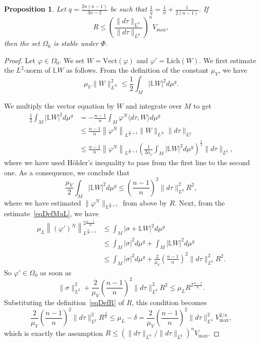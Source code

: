 \documentclass[a4paper, 10pt, reqno]{amsart}
\theoremstyle{plain}
\newtheorem{proposition}[thm]{Proposition}
\theoremstyle{remark}
\theoremstyle{definition}
\renewcommand{\phi}{\varphi}
\newcommand{\bL}{\mathbb{L}}
\let\<\langle
\let\>\rangle
\begin{document}
\begin{proposition}\label{propStability}
	Let $q = \frac{2n(n-1)}{3n-2}$ be such that $\frac{1}{q} = \frac{1}{n} +
		\frac{1}{2(n-1)}$. If
	\[
		R \leq \left(\frac{\|d\tau\|_{L^n}}{\|d\tau\|_{L^q}}\right)^n V_{\max},
	\]
	then the set $\Omega_0$ is stable under $\Phi$.
\end{proposition}

\begin{proof}
	Let $\phi \in \Omega_0$. We set $W = \mathrm{Vect}(\phi)$ and $\phi' =
		\mathrm{Lich}(W)$. We first estimate the $L^2$-norm of $\bL W$ as
	follows. From the definition of the constant $\mu_V$, we have
	\[
		\mu_V \|W\|_{L^N}^2 \leq \frac{1}{2} \int_M |\bL W|^2 d\mu^g.
	\]

	We multiply the vector equation by $W$ and integrate over $M$ to get
	\begin{align*}
		\frac{1}{2} \int_M |\bL W|^2 d\mu^g
		 & = - \frac{n-1}{n} \int_M \phi^N \< d\tau, W\> d\mu^g                                                                                              \\
		 & \leq \frac{n-1}{n} \left\|\phi^N\right\|_{L^{\frac{N}{2}+1}} \|W\|_{L^N} \|d\tau\|_{L^q}                                                          \\
		 & \leq \frac{n-1}{n} \left\|\phi^N\right\|_{L^{\frac{N}{2}+1}} \left(\frac{1}{2\mu_V} \int_M |\bL W|^2 d\mu^g\right)^{\frac{1}{2}} \|d\tau\|_{L^q},
	\end{align*}
	where we have used H\"older's inequality to pass from the first line to the
	second one. As a consequence, we conclude that
	\[
		\frac{\mu_V}{2} \int_M |\bL W|^2 d\mu^g \leq \left(\frac{n-1}{n}\right)^2 \|d\tau\|_{L^q}^2 R^2,
	\]
	where we have estimated $\|\phi^N\|_{L^{\frac{N}{2}+1}}$ from above by $R$.
	Next, from the estimate~\eqref{eqDefMuL}, we have
	\begin{align*}
		\mu_L \left\|(\phi')^N\right\|_{L^{\frac{N}{2}+1}}^{2 \frac{n-1}{n}}
		 & \leq \int_M |\sigma + \bL W|^2 d\mu^g                                                               \\
		 & \leq \int_M |\sigma|^2 d\mu^g + \int_M |\bL W|^2 d\mu^g                                             \\
		 & \leq \int_M |\sigma|^2 d\mu^g + \frac{2}{\mu_V} \left(\frac{n-1}{n}\right)^2 \|d\tau\|_{L^q}^2 R^2.
	\end{align*}
	So $\phi' \in \Omega_0$ as soon as
	\[
		\|\sigma\|_{L^2}^2 + \frac{2}{\mu_V} \left(\frac{n-1}{n}\right)^2 \|d\tau\|_{L^q}^2 R^2 \leq \mu_L R^{2 \frac{n-1}{n}}.
	\]
	Substituting the definition~\eqref{eqDefR} of $R$, this condition becomes
	\[
		\frac{2}{\mu_V} \left(\frac{n-1}{n}\right)^2 \|d\tau\|_{L^q}^2 R^{\frac{2}{n}}
		\leq \mu_L - \delta
		= \frac{2}{\mu_V}\left(\frac{n-1}{n}\right)^2 \|d\tau\|_{L^n}^2 V_{\max}^{2/n},
	\]
	which is exactly the assumption $R \leq (\|d\tau\|_{L^n}/\|d\tau\|_{L^q})^n
		V_{\max}$.
\end{proof}
\end{document}
